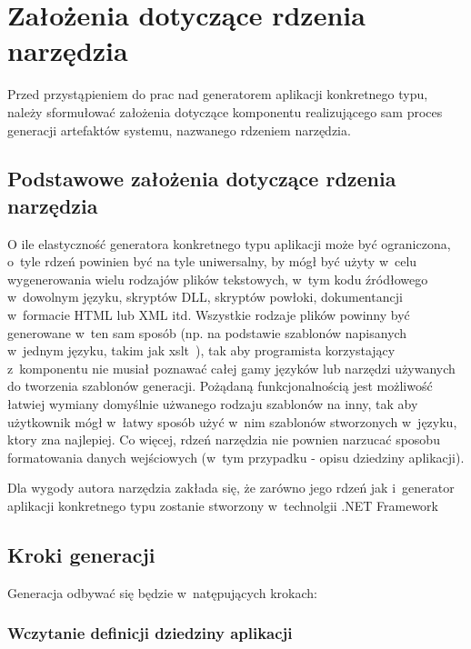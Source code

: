 \chapter{Założenia dotyczące rdzenia narzędzia} \label{chap:implementation:core}

Przed przystąpieniem do prac nad generatorem aplikacji konkretnego typu, należy sformułować założenia dotyczące komponentu realizującego sam proces generacji artefaktów systemu, nazwanego rdzeniem narzędzia.



\section{Podstawowe założenia dotyczące rdzenia narzędzia} \label{sec:core:basic_requirements}

O ile elastyczność generatora konkretnego typu aplikacji może być ograniczona, o~tyle rdzeń powinien być na tyle uniwersalny, by mógł być użyty w~celu wygenerowania wielu rodzajów plików tekstowych, w~tym kodu źródłowego w~dowolnym języku, skryptów DLL, skryptów powłoki, dokumentancji w~formacie HTML lub XML itd.
Wszystkie rodzaje plików powinny być generowane w~ten sam sposób (np. na podstawie szablonów napisanych w~jednym języku, takim jak xslt~\cite{xslt}), tak aby programista korzystający z~komponentu nie musiał poznawać całej gamy języków lub narzędzi używanych do tworzenia szablonów generacji.
Pożądaną funkcjonalnością jest możliwość łatwiej wymiany domyślnie użwanego rodzaju szablonów na inny, tak aby użytkownik mógł w~łatwy sposób użyć w~nim szablonów stworzonych w~języku, ktory zna najlepiej.
Co więcej, rdzeń narzędzia nie pownien narzucać sposobu formatowania danych wejściowych (w~tym przypadku - opisu dziedziny aplikacji).

Dla wygody autora narzędzia zakłada się, że zarówno jego rdzeń jak i~generator aplikacji konkretnego typu zostanie stworzony w~technolgii .NET Framework



\section{Kroki generacji}

Generacja odbywać się będzie w~natępujących krokach:


\subsection{Wczytanie definicji dziedziny aplikacji}

